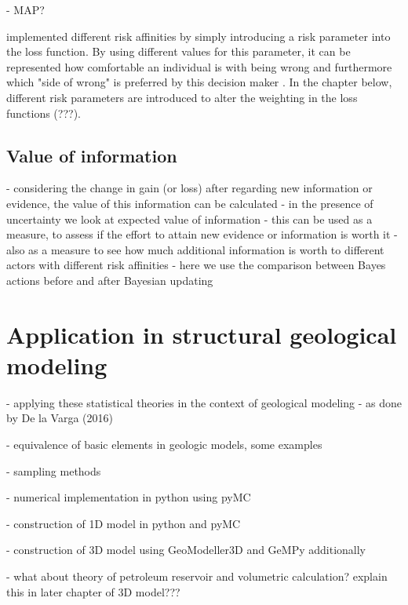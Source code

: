         - MAP?
        
        \citet{davidson2015} implemented different risk affinities by simply  introducing a risk parameter into the loss function. By using different values for this parameter, it can be represented how comfortable an individual is with being wrong and furthermore which "side of wrong" is preferred by this decision maker \citep{davidson2015}. In the chapter below, different risk parameters are introduced to alter the weighting in the loss functions (???).
        
        \subsection{Value of information}
        - considering the change in gain (or loss) after regarding new information or evidence, the value of this information can be calculated
        - in the presence of uncertainty we look at expected value of information
        - this can be used as a measure, to assess if the effort to attain new evidence or information is worth it
        - also as a measure to see how much additional information is worth to different actors with different risk affinities
        - here we use the comparison between Bayes actions before and after Bayesian updating
        
        \section{Application in structural geological modeling}
        
        - applying these statistical theories in the context of geological modeling 
        - as done by De la Varga (2016)
        
        - equivalence of basic elements in geologic models, some examples
        
        - sampling methods
        
        - numerical implementation in python using pyMC
        
        - construction of 1D model in python and pyMC
        
        - construction of 3D model using GeoModeller3D and GeMPy additionally
        
        - what about theory of petroleum reservoir and volumetric calculation? explain this in later chapter of 3D model???     
             
